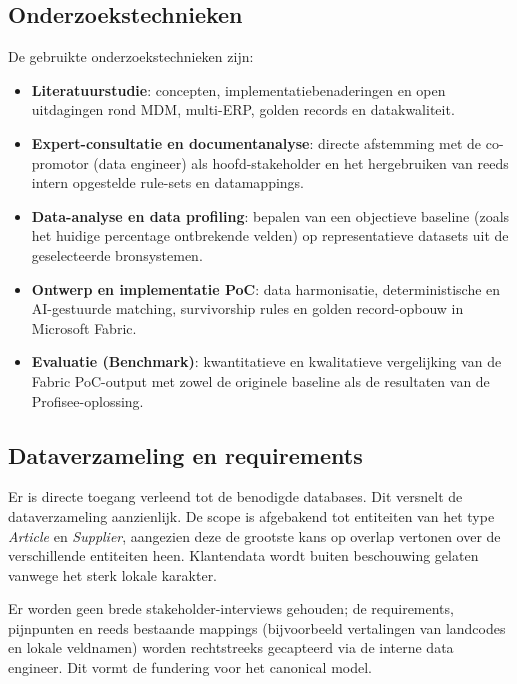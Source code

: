 \subsection{Onderzoekstechnieken}
De gebruikte onderzoekstechnieken zijn:
\begin{itemize}
  \item \textbf{Literatuurstudie}: concepten, implementatiebenaderingen en open uitdagingen rond MDM, multi-ERP, golden records en datakwaliteit.
  \item \textbf{Expert-consultatie en documentanalyse}: directe afstemming met de co-promotor (data engineer) als hoofd-stakeholder en het hergebruiken van reeds intern opgestelde rule-sets en datamappings.
  \item \textbf{Data-analyse en data profiling}: bepalen van een objectieve baseline (zoals het huidige percentage ontbrekende velden) op representatieve datasets uit de geselecteerde bronsystemen.
  \item \textbf{Ontwerp en implementatie PoC}: data harmonisatie, deterministische en AI-gestuurde matching, survivorship rules en golden record-opbouw in Microsoft Fabric.
  \item \textbf{Evaluatie (Benchmark)}: kwantitatieve en kwalitatieve vergelijking van de Fabric PoC-output met zowel de originele baseline als de resultaten van de Profisee-oplossing.
\end{itemize}

\subsection{Dataverzameling en requirements}
 Er is directe toegang verleend tot de benodigde databases. Dit versnelt de dataverzameling aanzienlijk. De scope is afgebakend tot entiteiten van het type \emph{Article} en \emph{Supplier}, aangezien deze de grootste kans op overlap vertonen over de verschillende entiteiten heen. Klantendata wordt buiten beschouwing gelaten vanwege het sterk lokale karakter. 

Er worden geen brede stakeholder-interviews gehouden; de requirements, pijnpunten en reeds bestaande mappings (bijvoorbeeld vertalingen van landcodes en lokale veldnamen) worden rechtstreeks gecapteerd via de interne data engineer. Dit vormt de fundering voor het canonical model.

